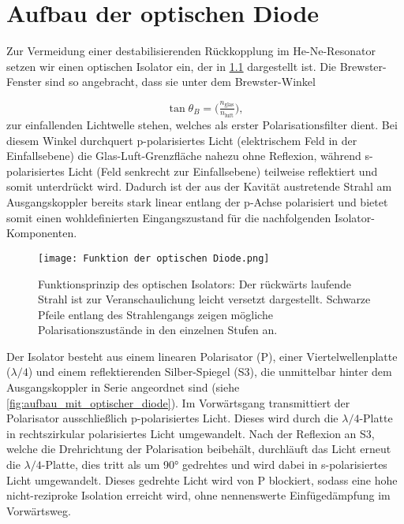 \chapter{ Aufbau der optischen Diode}


Zur Vermeidung einer destabilisierenden Rückkopplung im He-Ne-Resonator setzen wir einen optischen Isolator ein, der in \cref{fig:function_of_optical_diode} dargestellt ist. 
Die Brewster-Fenster sind so angebracht, dass sie unter dem Brewster-Winkel \cite{introtoED}

\begin{equation}
  \tan\theta_B = \bigl(\tfrac{n_{\mathrm{glas}}}{n_{\mathrm{luft}}}\bigr),
\end{equation}
zur einfallenden Lichtwelle stehen, welches als erster Polarisationsfilter dient. 
Bei diesem Winkel durchquert p-polarisiertes Licht (elektrischem Feld in der Einfallsebene) die Glas-Luft-Grenzfläche nahezu ohne Reflexion, während s-polarisiertes Licht (Feld senkrecht zur Einfallsebene) teilweise reflektiert und somit unterdrückt wird. 
Dadurch ist der aus der Kavität austretende Strahl am Ausgangskoppler bereits stark linear entlang der p-Achse polarisiert und bietet somit einen wohldefinierten Eingangszustand für die nachfolgenden Isolator-Komponenten.

\begin{figure}[htbp]
  \centering
  \texttt{[image: Funktion der optischen Diode.png]}
  \caption{Funktionsprinzip des optischen Isolators: Der rückwärts laufende Strahl ist zur Veranschaulichung leicht versetzt dargestellt. Schwarze Pfeile entlang des Strahlengangs zeigen mögliche Polarisationszustände in den einzelnen Stufen an. \cite{praktikum}}
  \label{fig:function_of_optical_diode}
\end{figure}

Der Isolator besteht aus einem linearen Polarisator (P), einer Viertelwellenplatte ($\lambda/4$) und einem reflektierenden Silber-Spiegel (S3), die unmittelbar hinter dem Ausgangskoppler in Serie angeordnet sind (siehe \cref{fig:aufbau_mit_optischer_diode}). 
Im Vorwärtsgang transmittiert der Polarisator ausschließlich p-polarisiertes Licht.
Dieses wird durch die $\lambda/4$-Platte in rechtszirkular polarisiertes Licht umgewandelt.
Nach der Reflexion an S3, welche die Drehrichtung der Polarisation beibehält, durchläuft das Licht erneut die $\lambda/4$-Platte, dies tritt als um 90° gedrehtes und wird dabei in s-polarisiertes Licht umgewandelt.
Dieses gedrehte Licht wird von P blockiert, sodass eine hohe nicht-reziproke Isolation erreicht wird, ohne nennenswerte Einfügedämpfung im Vorwärtsweg.

